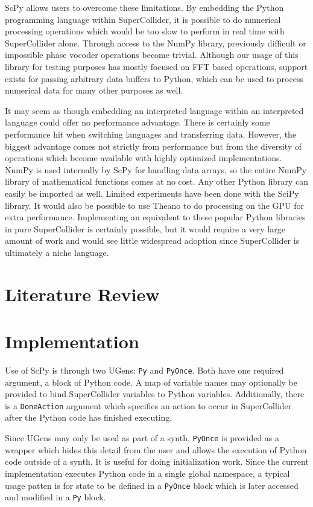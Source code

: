 \documentclass{article}
\begin{document}
ScPy allows users to overcome these limitations. By embedding the Python programming language
within SuperCollider, it is possible to do numerical processing operations which would be too slow
to perform in real time with SuperCollider alone. Through access to the NumPy library, previously
difficult or impossible phase vocoder operations become trivial.  Although our usage of this
library for testing purposes has mostly focused on FFT based operations, support exists for passing
arbitrary data buffers to Python, which can be used to process numerical data for many other
purposes as well.

It may seem as though embedding an interpreted language within an interpreted language could offer
no performance advantage. There is certainly some performance hit when switching languages and
transferring data. However, the biggest advantage comes not strictly from performance but from the
diversity of operations which become available with highly optimized implementations. NumPy is used
internally by ScPy for handling data arrays, so the entire NumPy library of mathematical functions
comes at no cost.  Any other Python library can easily be imported as well. Limited experiments
have been done with the SciPy library. It would also be possible to use Theano to do processing on
the GPU for extra performance. Implementing an equivalent to these popular Python libraries in pure
SuperCollider is certainly possible, but it would require a very large amount of work and would see
little widespread adoption since SuperCollider is ultimately a niche language.

\section{Literature Review}

\section{Implementation}

Use of ScPy is through two UGens: \texttt{Py} and \texttt{PyOnce}. Both have one required argument,
a block of Python code. A map of variable names may optionally be provided to bind SuperCollider
variables to Python variables.  Additionally, there is a \texttt{DoneAction} argument which
specifies an action to occur in SuperCollider after the Python code has finished executing.

Since UGens may only be used as part of a synth, \texttt{PyOnce} is provided as a wrapper which
hides this detail from the user and allows the execution of Python code outside of a synth. It is
useful for doing initialization work.  Since the current implementation executes Python code in a
single global namespace, a typical usage patten is for state to be defined in a \texttt{PyOnce}
block which is later accessed and modified in a \texttt{Py} block.
\end{document}
